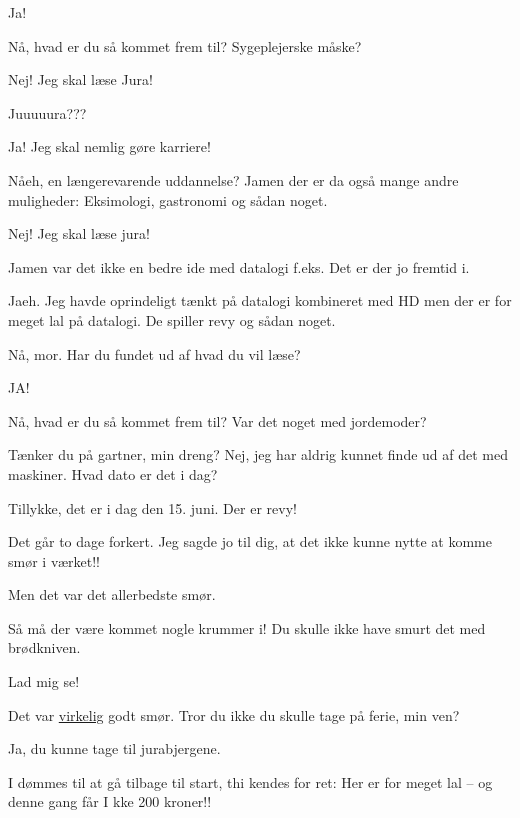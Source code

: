 \documentclass[a4paper,11pt]{article}
\begin{document}
\begin{sketch}
 Ja!

 Nå, hvad er du så kommet frem til? Sygeplejerske måske?

  Nej! Jeg skal læse Jura!

 Juuuuura???

 Ja! Jeg skal nemlig gøre karriere!

 Nåeh, en længerevarende uddannelse? Jamen der er da også mange andre
muligheder: Eksimologi, gastronomi og sådan noget.

 Nej! Jeg skal læse jura!

 Jamen var det ikke en bedre ide med datalogi f.eks. Det er der jo
fremtid i.

 Jaeh. Jeg havde oprindeligt tænkt på datalogi kombineret med HD men der
er for meget lal på datalogi. De spiller revy og sådan noget.


 Nå, mor. Har du fundet ud af hvad du vil læse?

 JA!

 Nå, hvad er du så kommet frem til? Var det noget med jordemoder?

 Tænker du på gartner, min dreng? Nej, jeg har aldrig kunnet finde ud af
det med maskiner.  Hvad dato er det i
dag? 

  Tillykke, det er i
dag den 15. juni. Der er revy!

  Det går to dage forkert.  Jeg sagde
jo til dig, at det ikke kunne nytte at komme smør i værket!!

  Men det var det allerbedste smør.

 Så må der være kommet nogle krummer i! Du skulle ikke have smurt det
med brødkniven.

 Lad mig se! 

  Det var \underline{virkelig} godt
smør. Tror du ikke du skulle tage på ferie, min ven?

 Ja, du kunne tage til jurabjergene.


 I dømmes til at gå tilbage til start, thi kendes for ret: Her er for
meget lal -- og denne gang får I kke 200 kroner!!
\end{sketch}
\end{document}
